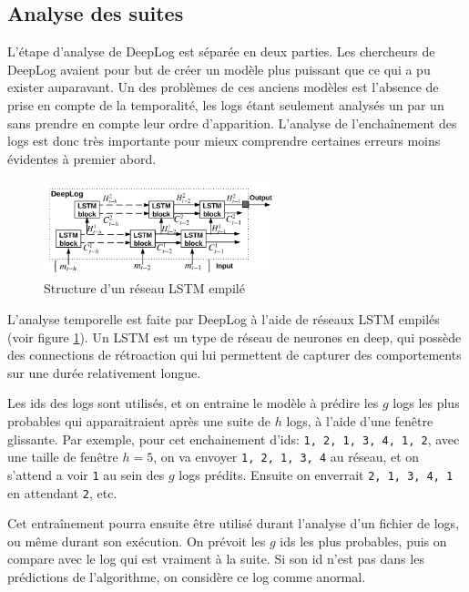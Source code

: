 \documentclass[openany, 11pt]{memoir}
\begin{document}
\subsection{Analyse des suites}

L'étape d'analyse de DeepLog est séparée en deux parties. Les chercheurs de DeepLog avaient pour but de créer un modèle plus puissant que ce qui a pu exister auparavant. Un des problèmes de ces anciens modèles est l'absence de prise en compte de la temporalité, les \glspl{log} étant seulement analysés un par un sans prendre en compte leur ordre d'apparition. L'analyse de l'enchaînement des \glspl{log} est donc très importante pour mieux comprendre certaines erreurs moins évidentes à premier abord.

\begin{figure}[ht]
	\centering
	\includegraphics[width=0.6\textwidth]{images/stacked_lstm.png}
	\caption{Structure d'un réseau LSTM empilé}
	\label{lstm}
\end{figure}

L'analyse temporelle est faite par DeepLog à l'aide de réseaux \gls{LSTM} empilés (voir figure \ref{lstm}). Un \gls{LSTM} est un type de réseau de neurones en \gls{deep}, qui possède des connections de rétroaction qui lui permettent de capturer des comportements sur une durée relativement longue.

Les ids des \glspl{log} sont utilisés, et on entraine le modèle à prédire les $g$ \glspl{log} les plus probables qui apparaitraient après une suite de $h$ \glspl{log}, à l'aide d'une fenêtre glissante. Par exemple, pour cet enchainement d'ids: \texttt{1, 2, 1, 3, 4, 1, 2}, avec une taille de fenêtre $h=5$, on va envoyer \texttt{1, 2, 1, 3, 4} au réseau, et on s'attend a voir \texttt{1} au sein des $g$ \glspl{log} prédits. Ensuite on enverrait \texttt{2, 1, 3, 4, 1} en attendant \texttt{2}, etc.

\bigskip
Cet entraînement pourra ensuite être utilisé durant l'analyse d'un fichier de \glspl{log}, ou même durant son exécution. On prévoit les $g$ ids les plus probables, puis on compare avec le \gls{log} qui est vraiment à la suite. Si son id n'est pas dans les prédictions de l'algorithme, on considère ce log comme anormal.
\end{document}
